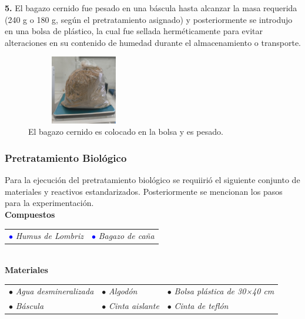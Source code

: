 \documentclass[12pt]{article}
\begin{document}
	
			\textbf{5.} El bagazo cernido fue pesado en una báscula hasta alcanzar la masa requerida (240 g o 180 g, según el pretratamiento asignado) y posteriormente se introdujo en una bolsa de plástico, la cual fue sellada herméticamente para evitar alteraciones en su contenido de humedad durante el almacenamiento o transporte.
			
			
			\begin{figure} [H]
				\centering
				\includegraphics[width=5cm, height=3cm]{imagenes/cernir_bagazo_pesado}
				\caption{El bagazo cernido es colocado en la bolsa y es pesado.}
				\label{cernir_bagazo_pesado}
			\end{figure}
			
			
			
			
			\subsubsection{Pretratamiento Biológico}
	
			
		Para la ejecución del pretratamiento biológico se requiirió el siguiente conjunto de materiales y reactivos estandarizados. Posteriormente se mencionan los pasos para la experimentación.\\
			
			\textbf{Compuestos} \\[0.5em]
			

				\begin{tabular}{p{0.3\textwidth}p{}}
				\textcolor{blue}{$\bullet$} \textit{Humus de Lombriz}  &	\textcolor{blue}{$\bullet$} \textit{Bagazo de caña}
			\end{tabular} \\[0.5em]
			
			\textbf{Materiales} \\[0.5em] 
	
			\begin{tabular}{p{}p{}p{}}
				$\bullet$ \textit{Agua desmineralizada } & $\bullet$ \textit{Algodón} & $\bullet$ \textit{Bolsa plástica de 30×40 cm }\\
				$\bullet$ \textit{Báscula} & $\bullet$ \textit{Cinta aislante} & $\bullet$ \textit{Cinta de teflón}
			\end{tabular}
			\\[1em]
			
\end{document}
